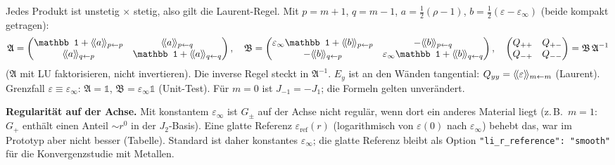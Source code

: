 Jedes Produkt ist unstetig $\times$ stetig, also gilt die Laurent-Regel. Mit $p=m+1$, $q=m-1$, $a=\tfrac12(\rho-1)$,
$b=\tfrac12(\varepsilon-\varepsilon_\infty)$ (beide kompakt getragen):
\begin{equation}
  \mathfrak A=\begin{pmatrix}\mathbb 1+\hk a_{p\leftarrow p}&\hk a_{p\leftarrow q}\\\hk a_{q\leftarrow p}&\mathbb 1+\hk a_{q\leftarrow q}\end{pmatrix},\quad
  \mathfrak B=\begin{pmatrix}\varepsilon_\infty\mathbb 1+\hk b_{p\leftarrow p}&-\hk b_{p\leftarrow q}\\-\hk b_{q\leftarrow p}&\varepsilon_\infty\mathbb 1+\hk b_{q\leftarrow q}\end{pmatrix},\quad
  \begin{pmatrix}Q_{++}&Q_{+-}\\Q_{-+}&Q_{--}\end{pmatrix}=\mathfrak B\,\mathfrak A^{-1}
  \label{eq:cyl_li}
\end{equation}
($\mathfrak A$ mit LU faktorisieren, nicht invertieren). Die inverse Regel steckt in $\mathfrak A^{-1}$. $E_y$ ist an
den Wänden tangential: $Q_{yy}=\langle\!\langle \varepsilon\rangle\!\rangle_{m\leftarrow m}$ (Laurent). Grenzfall $\varepsilon\equiv\varepsilon_\infty$:
$\mathfrak A=\mathbb 1$, $\mathfrak B=\varepsilon_\infty\mathbb 1$ (Unit-Test). Für $m=0$ ist $J_{-1}=-J_1$; die Formeln
gelten unverändert.

\textbf{Regularität auf der Achse.} Mit konstantem $\varepsilon_\infty$ ist $G_\pm$ auf der Achse nicht regulär, wenn dort
ein anderes Material liegt (z.\,B.\ $m=1$: $G_+$ enthält einen Anteil $\sim r^0$ in der $J_2$-Basis). Eine glatte
Referenz $\varepsilon_{\text{ref}}(r)$ (logarithmisch von $\varepsilon(0)$ nach $\varepsilon_\infty$) behebt das, war im
Prototyp aber nicht besser (Tabelle). Standard ist daher konstantes $\varepsilon_\infty$; die glatte Referenz bleibt als
Option \verb|"li_r_reference": "smooth"| für die Konvergenzstudie mit Metallen.

